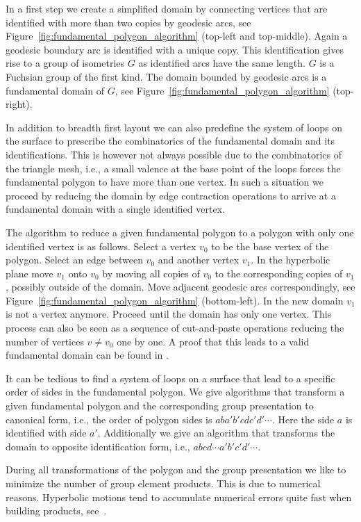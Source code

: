 \documentclass[Thesis]{subfiles}
\begin{document}
In a first step we create a simplified domain by connecting vertices that are identified with more than two copies by geodesic arcs, see Figure~\ref{fig:fundamental_polygon_algorithm} (top-left and top-middle). Again a geodesic boundary arc is identified with a unique copy. This identification gives rise to a group of isometries $G$ as identified arcs have the same length. $G$ is a Fuchsian group of the first kind. The domain bounded by geodesic arcs is a fundamental domain of $G$, see Figure~\ref{fig:fundamental_polygon_algorithm} (top-right).

In addition to breadth first layout we can also predefine the system of loops on the surface to prescribe the combinatorics of the fundamental domain and its identifications. This is however not always possible due to the combinatorics of the triangle mesh, i.e., a small valence at the base point of the loops forces the fundamental polygon to have more than one vertex. In such a situation we proceed by reducing the domain by edge contraction operations to arrive at a fundamental domain with a single identified vertex.

The algorithm to reduce a given fundamental polygon to a polygon with only one identified vertex is as follows. Select a vertex $v_0$ to be the base vertex of the polygon. Select an edge between $v_0$ and another vertex $v_1$. In the hyperbolic plane move $v_1$ onto $v_0$ by moving all copies of $v_0$ to the corresponding copies of $v_1$, possibly outside of the domain. Move adjacent geodesic arcs correspondingly, see Figure~\ref{fig:fundamental_polygon_algorithm} (bottom-left). In the new domain $v_1$ is not a vertex anymore. Proceed until the domain has only one vertex. This process can also be seen as a sequence of cut-and-paste operations reducing the number of vertices $v\neq v_0$ one by one. A proof that this leads to a valid fundamental domain can be found in \cite[p. 48]{Jost2007}.

It can be tedious to find a system of loops on a surface that lead to a specific order of sides in the fundamental polygon. We give algorithms that transform a given fundamental polygon and the corresponding group presentation to canonical form, i.e., the order of polygon sides is $aba'b'cdc'd'\cdots$. Here the side $a$ is identified with side $a'$. Additionally we give an algorithm that transforms the domain to opposite identification form, i.e., $abcd\cdots a'b'c'd'\cdots$.

During all transformations of the polygon and the group presentation we like to minimize the number of group element products. This is due to numerical reasons. Hyperbolic motions tend to accumulate numerical errors quite fast when building products, see~\cite{Floyd2002}.
\end{document}
